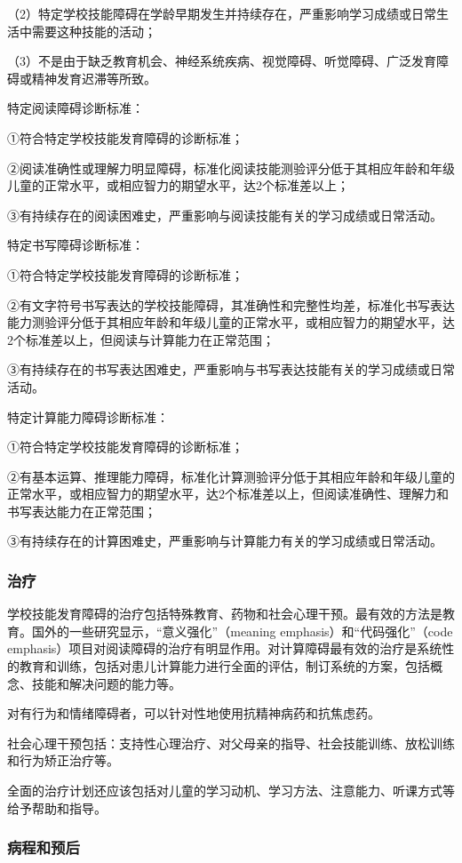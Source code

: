 （2）特定学校技能障碍在学龄早期发生并持续存在，严重影响学习成绩或日常生活中需要这种技能的活动；

（3）不是由于缺乏教育机会、神经系统疾病、视觉障碍、听觉障碍、广泛发育障碍或精神发育迟滞等所致。

特定阅读障碍诊断标准：

①符合特定学校技能发育障碍的诊断标准；

②阅读准确性或理解力明显障碍，标准化阅读技能测验评分低于其相应年龄和年级儿童的正常水平，或相应智力的期望水平，达2个标准差以上；

③有持续存在的阅读困难史，严重影响与阅读技能有关的学习成绩或日常活动。

特定书写障碍诊断标准：

①符合特定学校技能发育障碍的诊断标准；

②有文字符号书写表达的学校技能障碍，其准确性和完整性均差，标准化书写表达能力测验评分低于其相应年龄和年级儿童的正常水平，或相应智力的期望水平，达2个标准差以上，但阅读与计算能力在正常范围；

③有持续存在的书写表达困难史，严重影响与书写表达技能有关的学习成绩或日常活动。

特定计算能力障碍诊断标准：

①符合特定学校技能发育障碍的诊断标准；

②有基本运算、推理能力障碍，标准化计算测验评分低于其相应年龄和年级儿童的正常水平，或相应智力的期望水平，达2个标准差以上，但阅读准确性、理解力和书写表达能力在正常范围；

③有持续存在的计算困难史，严重影响与计算能力有关的学习成绩或日常活动。

\subsubsection{治疗}

学校技能发育障碍的治疗包括特殊教育、药物和社会心理干预。最有效的方法是教育。国外的一些研究显示，“意义强化”（meaning
emphasis）和“代码强化”（code
emphasis）项目对阅读障碍的治疗有明显作用。对计算障碍最有效的治疗是系统性的教育和训练，包括对患儿计算能力进行全面的评估，制订系统的方案，包括概念、技能和解决问题的能力等。

对有行为和情绪障碍者，可以针对性地使用抗精神病药和抗焦虑药。

社会心理干预包括：支持性心理治疗、对父母亲的指导、社会技能训练、放松训练和行为矫正治疗等。

全面的治疗计划还应该包括对儿童的学习动机、学习方法、注意能力、听课方式等给予帮助和指导。

\subsubsection{病程和预后}

